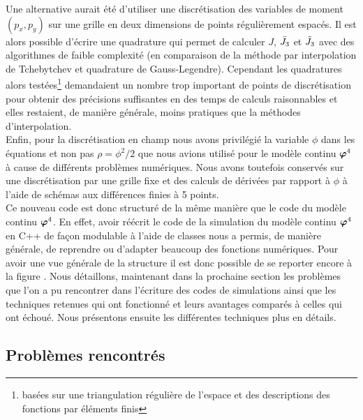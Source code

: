 \documentclass[10.5pt]{article}
\begin{document}
\begin{multicols}{2}
Une alternative aurait été d'utiliser une discrétisation des variables de moment $(p_x, p_y)$ sur une grille en deux dimensions de points régulièrement espacés. Il est alors possible d'écrire une quadrature qui permet de calculer $J$, $\bar{J}_3$ et $\tilde{J}_3$ avec des algorithmes de faible complexité (en comparaison de la méthode par interpolation de Tchebytchev et quadrature de Gauss-Legendre). Cependant les quadratures alors testées\footnote{basées sur une triangulation régulière de l'espace et des descriptions des fonctions par éléments finis} demandaient un nombre trop important de points de discrétisation pour obtenir des précisions suffisantes en des temps de calculs raisonnables et elles restaient, de manière générale, moins pratiques que la méthodes d'interpolation. \\


Enfin, pour la discrétisation en champ nous avons privilégié la variable $\phi$ dans les équations et non pas $\rho = \phi^2/2$ que nous avions utilisé pour le modèle continu $\boldsymbol{ \varphi}^4$ à cause de différents problèmes numériques. Nous avons toutefois conservés sur une discrétisation par une grille fixe et des calculs de dérivées par rapport à $\phi$ à l'aide de schémas aux différences finies à 5 points. \\



Ce nouveau code est donc structuré de la même manière que le code du modèle continu $\boldsymbol{ \varphi}^4$. En effet, avoir réécrit le code de la simulation du modèle continu $\boldsymbol{ \varphi}^4$ en C++ de façon modulable à l'aide de classes nous a permis, de manière générale, de reprendre ou d'adapter beaucoup des fonctions numériques. Pour avoir une vue générale de la structure il est donc possible de se reporter encore à la figure . Nous détaillons, maintenant dans la prochaine section les problèmes que l'on a pu rencontrer dans l'écriture des codes de simulations ainsi que les techniques retenues qui ont fonctionné et leurs avantages comparés à celles qui ont échoué. Nous présentons ensuite les différentes techniques plus en détails. 





\subsection{Problèmes rencontrés}

\label{sec:Problemes}


\end{multicols}
\end{document}
